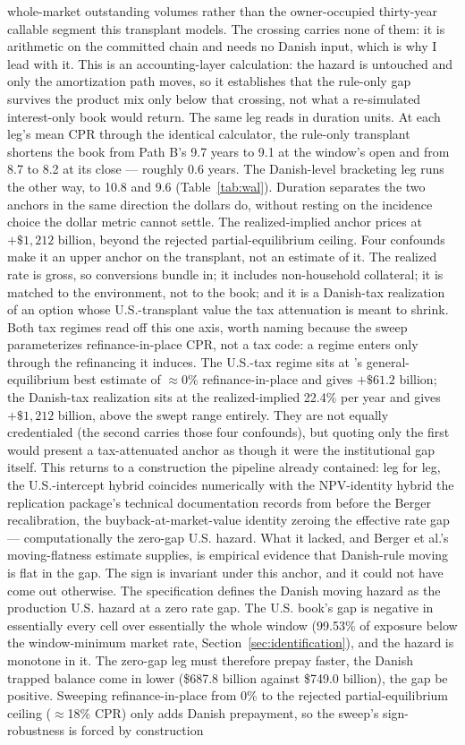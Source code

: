 \documentclass[12pt]{article}
\begin{document}
whole-market outstanding volumes rather than the owner-occupied thirty-year callable segment this transplant models. The crossing carries none of them: it is arithmetic on the committed chain and needs no Danish input, which is why I lead with it. This is an accounting-layer calculation: the hazard is untouched and only the amortization path moves, so it establishes that the rule-only gap survives the product mix only below that crossing, not what a re-simulated interest-only book would return. The same leg reads in duration units. At each leg's mean CPR through the identical calculator, the rule-only transplant shortens the book from Path B's 9.7 years to 9.1 at the window's open and from 8.7 to 8.2 at its close --- roughly 0.6 years. The Danish-level bracketing leg runs the other way, to 10.8 and 9.6 (Table~\ref{tab:wal}). Duration separates the two anchors in the same direction the dollars do, without resting on the incidence choice the dollar metric cannot settle. The realized-implied anchor prices at $+\$1{,}212$ billion, beyond the rejected partial-equilibrium ceiling. Four confounds make it an upper anchor on the transplant, not an estimate of it. The realized rate is gross, so conversions bundle in; it includes non-household collateral; it is matched to the environment, not to the book; and it is a Danish-tax realization of an option whose U.S.-transplant value the tax attenuation is meant to shrink. Both tax regimes read off this one axis, worth naming because the sweep parameterizes refinance-in-place CPR, not a tax code: a regime enters only through the refinancing it induces. The U.S.-tax regime sits at \citeauthor{berger2026}'s general-equilibrium best estimate of $\approx$0\% refinance-in-place and gives $+\$61.2$ billion; the Danish-tax realization sits at the realized-implied 22.4\% per year and gives $+\$1{,}212$ billion, above the swept range entirely. They are not equally credentialed (the second carries those four confounds), but quoting only the first would present a tax-attenuated anchor as though it were the institutional gap itself. This returns to a construction the pipeline already contained: leg for leg, the U.S.-intercept hybrid coincides numerically with the NPV-identity hybrid the replication package's technical documentation records from before the Berger recalibration, the buyback-at-market-value identity zeroing the effective rate gap --- computationally the zero-gap U.S. hazard. What it lacked, and Berger et al.'s moving-flatness estimate supplies, is empirical evidence that Danish-rule moving is flat in the gap. The sign is invariant under this anchor, and it could not have come out otherwise. The specification defines the Danish moving hazard as the production U.S. hazard at a zero rate gap. The U.S. book's gap is negative in essentially every cell over essentially the whole window (99.53\% of exposure below the window-minimum market rate, Section~\ref{sec:identification}), and the hazard is monotone in it. The zero-gap leg must therefore prepay faster, the Danish trapped balance come in lower (\$687.8 billion against \$749.0 billion), the gap be positive. Sweeping refinance-in-place from 0\% to the rejected partial-equilibrium ceiling ($\approx$18\% CPR) only adds Danish prepayment, so the sweep's sign-robustness is forced by construction 
\end{document}
